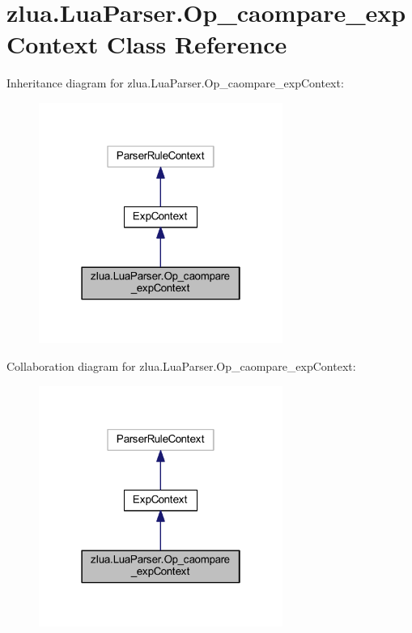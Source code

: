 \hypertarget{classzlua_1_1_lua_parser_1_1_op__caompare__exp_context}{}\section{zlua.\+Lua\+Parser.\+Op\+\_\+caompare\+\_\+exp\+Context Class Reference}
\label{classzlua_1_1_lua_parser_1_1_op__caompare__exp_context}


Inheritance diagram for zlua.\+Lua\+Parser.\+Op\+\_\+caompare\+\_\+exp\+Context\+:
\nopagebreak
\begin{figure}[H]
\begin{center}
\leavevmode
\includegraphics[width=226pt]{classzlua_1_1_lua_parser_1_1_op__caompare__exp_context__inherit__graph}
\end{center}
\end{figure}


Collaboration diagram for zlua.\+Lua\+Parser.\+Op\+\_\+caompare\+\_\+exp\+Context\+:
\nopagebreak
\begin{figure}[H]
\begin{center}
\leavevmode
\includegraphics[width=226pt]{classzlua_1_1_lua_parser_1_1_op__caompare__exp_context__coll__graph}
\end{center}
\end{figure}
